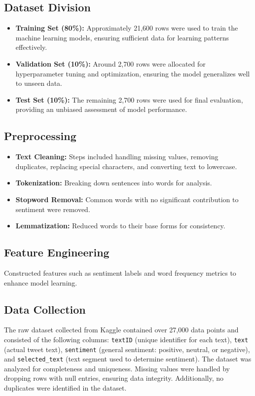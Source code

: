 \documentclass[journal]{IEEEtran}
\begin{document}
\subsection*{Dataset Division}
\begin{itemize}
    \item \textbf{Training Set (80\%):} Approximately 21,600 rows were used to train the machine learning models, ensuring sufficient data for learning patterns effectively.
    \item \textbf{Validation Set (10\%):} Around 2,700 rows were allocated for hyperparameter tuning and optimization, ensuring the model generalizes well to unseen data.
    \item \textbf{Test Set (10\%):} The remaining 2,700 rows were used for final evaluation, providing an unbiased assessment of model performance.
\end{itemize}

\subsection*{Preprocessing}
\begin{itemize}
    \item \textbf{Text Cleaning:} Steps included handling missing values, removing duplicates, replacing special characters, and converting text to lowercase.
    \item \textbf{Tokenization:} Breaking down sentences into words for analysis.
    \item \textbf{Stopword Removal:} Common words with no significant contribution to sentiment were removed.
    \item \textbf{Lemmatization:} Reduced words to their base forms for consistency.
\end{itemize}

\subsection*{Feature Engineering}
Constructed features such as sentiment labels and word frequency metrics to enhance model learning.

\subsection{\textbf{Data Collection}}

The raw dataset collected from Kaggle contained over 27,000 data points and consisted of the following columns: \texttt{textID} (unique identifier for each text), \texttt{text} (actual tweet text), \texttt{sentiment} (general sentiment: positive, neutral, or negative), and \texttt{selected\_text} (text segment used to determine sentiment). The dataset was analyzed for completeness and uniqueness. Missing values were handled by dropping rows with null entries, ensuring data integrity. Additionally, no duplicates were identified in the dataset.
\end{document}
